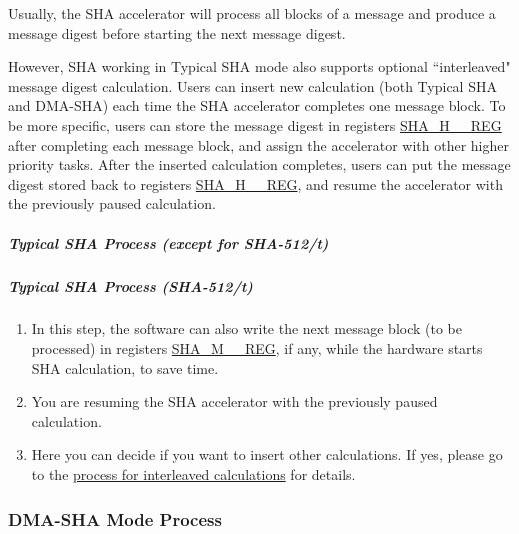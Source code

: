 \documentclass[main\_\_EN.tex]{subfiles}
\begin{document}
Usually, the SHA accelerator will process all blocks of a message and produce a message digest before starting the next message digest.

However, \chipname{} SHA working in Typical SHA mode also supports optional ``interleaved" message digest calculation. Users can insert new calculation (both Typical SHA and DMA-SHA) each time the SHA accelerator completes one message block. To be more specific, users can store the message digest in registers \hyperref[regdesc:SHAHNREG]{SHA\_H\_\_REG} after completing each message block, and assign the accelerator with other higher priority tasks. After the inserted calculation completes, users can put the message digest stored back to registers \hyperref[regdesc:SHAHNREG]{SHA\_H\_\_REG}, and resume the accelerator with the previously paused calculation.

\subparagraph{Typical SHA Process (except for SHA-512/{\it{t}})}

    

\subparagraph{Typical SHA Process (SHA-512/{\it{t}})}

    

\begin{tiplisting}\label{others:sha-note-typical-sha}
\vspace{-2.5em}
\begin{enumerate}
\item In this step, the software can also write the next message block (to be processed) in registers \hyperref[regdesc:SHAMNREG]{SHA\_M\_\_REG}, if any, while the hardware starts SHA calculation, to save time.
\item You are resuming the SHA accelerator with the previously paused calculation.
\item Here you can decide if you want to insert other calculations. If yes, please go to the \hyperref[others:sha-interleaved]{process for interleaved calculations} for details.
\end{enumerate}
\end{tiplisting}




\subsubsection{DMA-SHA Mode Process}\label{sec:sha-dma-sha}
\end{document}
